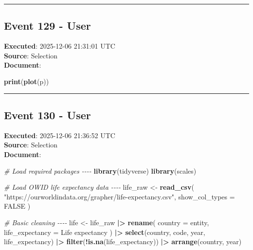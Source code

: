 \documentclass[
  11pt,
]{article}
\newenvironment{Shaded}{\begin{snugshade}}{\end{snugshade}}
\newcommand{\AttributeTok}[1]{\textcolor[rgb]{0.13,0.29,0.53}{#1}}
\newcommand{\CommentTok}[1]{\textcolor[rgb]{0.56,0.35,0.01}{\textit{#1}}}
\newcommand{\ConstantTok}[1]{\textcolor[rgb]{0.56,0.35,0.01}{#1}}
\newcommand{\FunctionTok}[1]{\textcolor[rgb]{0.13,0.29,0.53}{\textbf{#1}}}
\newcommand{\NormalTok}[1]{#1}
\newcommand{\OtherTok}[1]{\textcolor[rgb]{0.56,0.35,0.01}{#1}}
\newcommand{\SpecialCharTok}[1]{\textcolor[rgb]{0.81,0.36,0.00}{\textbf{#1}}}
\newcommand{\StringTok}[1]{\textcolor[rgb]{0.31,0.60,0.02}{#1}}
\begin{document}
\begin{center}\rule{0.5\linewidth}{0.5pt}\end{center}

\subsection{Event 129 - User}\label{event-129---user}

\textbf{Executed}: 2025-12-06 21:31:01 UTC\\
\textbf{Source}: Selection\\
\textbf{Document}:

\begin{Shaded}
\begin{Highlighting}[]
\FunctionTok{print}\NormalTok{(}\FunctionTok{plot}\NormalTok{(p))}
\end{Highlighting}
\end{Shaded}

\begin{center}\rule{0.5\linewidth}{0.5pt}\end{center}

\subsection{Event 130 - User}\label{event-130---user}

\textbf{Executed}: 2025-12-06 21:36:52 UTC\\
\textbf{Source}: Selection\\
\textbf{Document}:

\begin{Shaded}
\begin{Highlighting}[]
\CommentTok{\# Load required packages {-}{-}{-}{-}}
\FunctionTok{library}\NormalTok{(tidyverse)}
\FunctionTok{library}\NormalTok{(scales)}

\CommentTok{\# Load OWID life expectancy data {-}{-}{-}{-}}
\NormalTok{life\_raw }\OtherTok{\textless{}{-}} \FunctionTok{read\_csv}\NormalTok{(}
  \StringTok{"https://ourworldindata.org/grapher/life{-}expectancy.csv"}\NormalTok{,}
  \AttributeTok{show\_col\_types =} \ConstantTok{FALSE}
\NormalTok{)}

\CommentTok{\# Basic cleaning {-}{-}{-}{-}}
\NormalTok{life }\OtherTok{\textless{}{-}}\NormalTok{ life\_raw }\SpecialCharTok{|\textgreater{}}
  \FunctionTok{rename}\NormalTok{(}
    \AttributeTok{country =}\NormalTok{ entity,}
    \AttributeTok{life\_expectancy =} \StringTok{\textasciigrave{}}\AttributeTok{Life expectancy}\StringTok{\textasciigrave{}}
\NormalTok{  ) }\SpecialCharTok{|\textgreater{}}
  \FunctionTok{select}\NormalTok{(country, code, year, life\_expectancy) }\SpecialCharTok{|\textgreater{}}
  \FunctionTok{filter}\NormalTok{(}\SpecialCharTok{!}\FunctionTok{is.na}\NormalTok{(life\_expectancy)) }\SpecialCharTok{|\textgreater{}}
  \FunctionTok{arrange}\NormalTok{(country, year)}
\end{Highlighting}
\end{Shaded}
\end{document}

